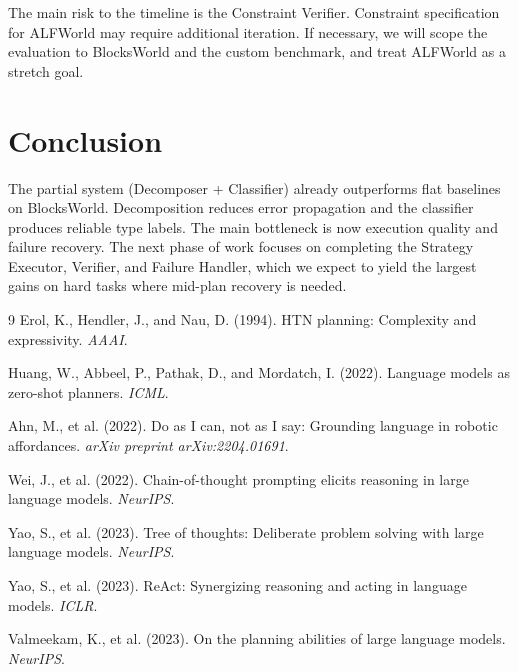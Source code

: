 \documentclass{article}
\begin{document}
The main risk to the timeline is the Constraint Verifier. Constraint specification for ALFWorld may require additional iteration. If necessary, we will scope the evaluation to BlocksWorld and the custom benchmark, and treat ALFWorld as a stretch goal.

\section{Conclusion}

The partial system (Decomposer + Classifier) already outperforms flat baselines on BlocksWorld. Decomposition reduces error propagation and the classifier produces reliable type labels. The main bottleneck is now execution quality and failure recovery. The next phase of work focuses on completing the Strategy Executor, Verifier, and Failure Handler, which we expect to yield the largest gains on hard tasks where mid-plan recovery is needed.


\begin{thebibliography}{9}
Erol, K., Hendler, J., and Nau, D. (1994). HTN planning: Complexity and expressivity. \textit{AAAI}.

Huang, W., Abbeel, P., Pathak, D., and Mordatch, I. (2022). Language models as zero-shot planners. \textit{ICML}.

Ahn, M., et al. (2022). Do as I can, not as I say: Grounding language in robotic affordances. \textit{arXiv preprint arXiv:2204.01691}.

Wei, J., et al. (2022). Chain-of-thought prompting elicits reasoning in large language models. \textit{NeurIPS}.

Yao, S., et al. (2023). Tree of thoughts: Deliberate problem solving with large language models. \textit{NeurIPS}.

Yao, S., et al. (2023). ReAct: Synergizing reasoning and acting in language models. \textit{ICLR}.

Valmeekam, K., et al. (2023). On the planning abilities of large language models. \textit{NeurIPS}.
\end{thebibliography}
\end{document}

